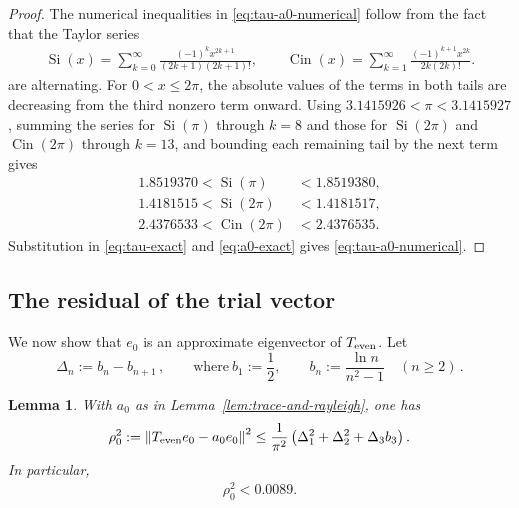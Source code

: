 \documentclass[11pt]{article}
\newtheorem{lemma}[theorem]{Lemma}
\theoremstyle{definition}
\theoremstyle{remark}
\newcommand{\norm}[1]{\left\lVert #1\right\rVert}
\begin{document}
\begin{proof}
The numerical inequalities in
\eqref{eq:tau-a0-numerical} follow from the fact that the Taylor series
\begin{align*}
\operatorname{Si}(x)
=\sum_{k=0}^\infty
\frac{(-1)^k x^{2k+1}}{(2k+1)(2k+1)!},
\qquad
\operatorname{Cin}(x)
=\sum_{k=1}^\infty
\frac{(-1)^{k+1}x^{2k}}{2k(2k)!}.
\end{align*}
are alternating. For $0<x\leq2\pi$, the absolute values of the terms in both tails
are decreasing from the third nonzero term onward.  Using
$3.1415926<\pi<3.1415927$, summing the series for
$\operatorname{Si}(\pi)$ through $k=8$ and those for
$\operatorname{Si}(2\pi)$ and $\operatorname{Cin}(2\pi)$ through
$k=13$, and bounding each remaining tail by the next term gives
\begin{align*}
1.8519370<\operatorname{Si}(\pi)&<1.8519380,\\
1.4181515<\operatorname{Si}(2\pi)&<1.4181517,\\
2.4376533<\operatorname{Cin}(2\pi)&<2.4376535.
\end{align*}
Substitution in \eqref{eq:tau-exact} and \eqref{eq:a0-exact} gives
\eqref{eq:tau-a0-numerical}.
\end{proof}


\subsection*{The residual of the trial vector}

We now show that $e_0$ is an approximate eigenvector of $T_{\rm even}$. Let
\[
\Delta_n:=b_n-b_{n+1} \,,
\qquad\text{where}\ 
b_1:=\frac12,
\qquad
b_n:=\frac{\ln n}{n^2-1}\quad(n\geq2) \,.
\]

\begin{lemma}\label{lem:e0-residual}
With $a_0$ as in Lemma~\ref{lem:trace-and-rayleigh}, one has
\begin{equation}\label{eq:rho-explicit-bound}
\rho_0^2:=\norm{T_{\rm even}e_0-a_0e_0}^2 \leq \frac{1}{\pi^2} \left(\Delta_1^2+\Delta_2^2+\Delta_3b_3\right).
\end{equation}
In particular,
\begin{align}
    \label{eq:e0-residual}
    \rho_0^2 < 0.0089.
\end{align}
\end{lemma}
\end{document}
